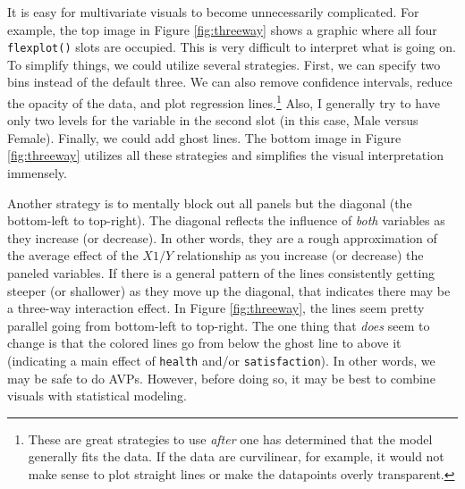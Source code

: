 \documentclass[
  doc]{apa6}
\begin{document}
It is easy for multivariate visuals to become unnecessarily complicated. For example, the top image in Figure \ref{fig:threeway} shows a graphic where all four \texttt{flexplot()} slots are occupied. This is very difficult to interpret what is going on. To simplify things, we could utilize several strategies. First, we can specify two bins instead of the default three. We can also remove confidence intervals, reduce the opacity of the data, and plot regression lines.\footnote{These are great strategies to use \emph{after} one has determined that the model generally fits the data. If the data are curvilinear, for example, it would not make sense to plot straight lines or make the datapoints overly transparent.} Also, I generally try to have only two levels for the variable in the second slot (in this case, Male versus Female). Finally, we could add ghost lines. The bottom image in Figure \ref{fig:threeway} utilizes all these strategies and simplifies the visual interpretation immensely.

Another strategy is to mentally block out all panels but the diagonal (the bottom-left to top-right). The diagonal reflects the influence of \emph{both} variables as they increase (or decrease). In other words, they are a rough approximation of the average effect of the \(X1/Y\) relationship as you increase (or decrease) the paneled variables. If there is a general pattern of the lines consistently getting steeper (or shallower) as they move up the diagonal, that indicates there may be a three-way interaction effect. In Figure \ref{fig:threeway}, the lines seem pretty parallel going from bottom-left to top-right. The one thing that \emph{does} seem to change is that the colored lines go from below the ghost line to above it (indicating a main effect of \texttt{health} and/or \texttt{satisfaction}). In other words, we may be safe to do AVPs. However, before doing so, it may be best to combine visuals with statistical modeling.
\end{document}
